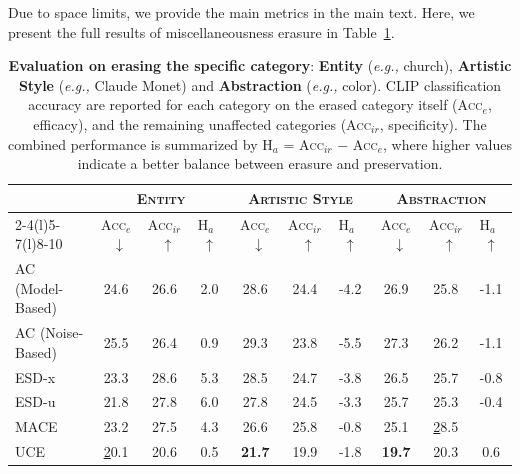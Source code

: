 Due to space limits, we provide the main metrics in the main text. Here, we present the full results of miscellaneousness erasure in Table~\ref{tab: appendix full results of Entity, Artistic Style, and Abstraction}.
\begin{table}[t]
\centering
\caption{\textbf{Evaluation on erasing the specific category}: \textbf{Entity} (\textit{e.g.,} church), \textbf{Artistic Style} (\textit{e.g.,} Claude Monet) and \textbf{Abstraction} (\textit{e.g.,} color). CLIP classification accuracy are reported for each category on the erased category itself (\textsc{Acc$_e$}, efficacy), and the remaining unaffected categories (\textsc{Acc$_{ir}$}, specificity). The combined performance is summarized by H$_a$ = \textsc{Acc$_{ir}$} $-$ \textsc{Acc$_e$}, where higher values indicate a better balance between erasure and preservation.}
\label{tab: appendix full results of Entity, Artistic Style, and Abstraction}
\begin{tabular}{@{}lccccccccc@{}}
\toprule
 & \multicolumn{3}{c}{\textsc{Entity}} & \multicolumn{3}{c}{\textsc{Artistic Style}} & \multicolumn{3}{c}{\textsc{Abstraction}} \\ \cmidrule(l){2-4}\cmidrule(l){5-7}\cmidrule(l){8-10} 
\multirow{-2}{*}{\textsc{Method}} & \textsc{Acc$_e$}~$\downarrow$ & \textsc{Acc$_{ir}$}~$\uparrow$ & \cellcolor{gray!8}\textsc{H$_a$}~$\uparrow$ & \textsc{Acc$_e$}~$\downarrow$ & \textsc{Acc$_{ir}$}~$\uparrow$ & \cellcolor{gray!8}\textsc{H$_a$}~$\uparrow$ & \textsc{Acc$_e$}~$\downarrow$ & \textsc{Acc$_{ir}$}~$\uparrow$ & \cellcolor{gray!8}\textsc{H$_a$}~$\uparrow$ \\ \midrule
AC (Model-Based) & 24.6 & 26.6 & \cellcolor{gray!8}2.0 & 28.6 & 24.4 & \cellcolor{gray!8}-4.2 & 26.9 & 25.8 & \cellcolor{gray!8}-1.1 \\
AC (Noise-Based) & 25.5 & 26.4 & \cellcolor{gray!8}0.9 & 29.3 & 23.8 & \cellcolor{gray!8}-5.5 & 27.3 & 26.2 & \cellcolor{gray!8}-1.1 \\
ESD-x & 23.3 & 28.6 & \cellcolor{gray!8}5.3 & 28.5 & 24.7 & \cellcolor{gray!8}-3.8 & 26.5 & 25.7 & \cellcolor{gray!8}-0.8 \\
ESD-u & 21.8 & 27.8 & \cellcolor{gray!8}6.0 & 27.8 & 24.5 & \cellcolor{gray!8}-3.3 & 25.7 & 25.3 & \cellcolor{gray!8}-0.4 \\
MACE & 23.2 & 27.5 & \cellcolor{gray!8}4.3 & 26.6 & 25.8 & \cellcolor{gray!8}-0.8 & 25.1 & {\ul 28.5} & \cellcolor{gray!8}{\ul 3.4} \\
UCE & {\ul 20.1} & 20.6 & \cellcolor{gray!8}0.5 & \textbf{21.7} & 19.9 & \cellcolor{gray!8}-1.8 & \textbf{19.7} & 20.3 & \cellcolor{gray!8}0.6 \\

\end{tabular}
\end{table}
